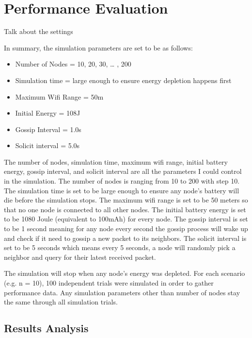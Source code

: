 \chapter{Performance Evaluation}
\label{Chapter5}

Talk about the settings

In summary, the simulation parameters are set to be as follows:
\begin{itemize}
	\item Number of Nodes = 10, 20, 30, … , 200
	\item Simulation time = large enough to ensure energy depletion happens first
	\item Maximum Wifi Range = 50m
	\item Initial Energy = 108J
	\item Gossip Interval = 1.0s
	\item Solicit interval = 5.0s 
\end{itemize}

The number of nodes, simulation time, maximum wifi range, initial battery energy, gossip interval, and solicit interval are all the parameters I could control in the simulation. The number of nodes is ranging from 10 to 200 with step 10. The simulation time is set to be large enough to ensure any node's battery will die before the simulation stops. The maximum wifi range is set to be 50 meters so that no one node is connected to all other nodes. The initial battery energy is set to be 1080 Joule (equivalent to 100mAh) for every node. The gossip interval is set to be 1 second meaning for any node every second the gossip process will wake up and check if it need to gossip a new packet to its neighbors. The solicit interval is set to be 5 seconds which means every 5 seconds, a node will randomly pick a neighbor and query for their latest received packet. 




The simulation will stop when any node's energy was depleted. For each scenario (e.g. n = 10), 100 independent trials were simulated in order to gather performance data. Any simulation parameters other than number of nodes stay the same through all simulation trials. 


\section{Results Analysis}



